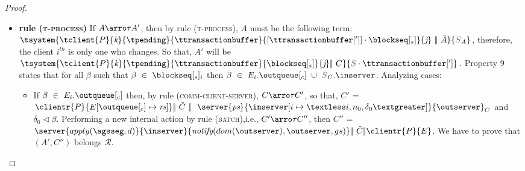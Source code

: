 \begin{proof}
\begin{itemize}
\begin{itemize}
						
\item {\bf rule (\textsc{t-process})} If $A \arroi{\tau} A'$, then by rule (\textsc{\footnotesize{t-process}}), $A$ must be the following term: $\tsystem{\tclient{\tprogram}{\tknown}{\tpending}{\ttransactionbuffer}{[\tsenthead] \cdot \tsent}{\treceivebuffer}\ \bigpar\ \tilde{A}}{\queuemessage_A}$, therefore, the client $i^{th}$ is only one who changes. So that, $A'$ will be $\tsystem{\tclient{\tprogram}{\tknown}{\tpending}{\ttransactionbuffer}{\tsent}{\treceivebuffer}\bigpar\ C}{\queuemessage \cdot \tsenthead}$. Property 9 states that for all $\beta$ such that $\beta \ \in \ \tsent_i$ then $\beta \ \in \ E_{i}.\outclient \ \cup \ \queuemessage_C.\inserver$. Analyzing cases:
					
					
					
					\begin{itemize}
						\item If $\beta \ \in\ E_{i}.\outclient$ then, by rule (\textsc{\footnotesize{comm-client-server}}), $C \arroi{\tau} C'$, so that, $C'$ = $\clientr{P}{\update{E}{\outclient}{\tailround}} \bigpar\ \tilde{C} \ \bigpar\ \ \server{\state}{\update{\inserver}{i}{\headerround}}{\outserver}_C$ and $\delta_0 \triangleleft \beta$. Performing a new internal action by rule (\textsc{\footnotesize{batch}}),i.e., $C' \arroi{\tau} C''$, then $C''$ = $\server{\apply{\persistedstate}{d}}{\inserver}{\notify{dom(\outserver)}{\outserver}{gs}}  \bigpar\ \tilde{C} \bigpar \clientr{P}{\stateclient}$. We have to prove that $(A',C'')$ belongs $\mathcal{R}$.
						

\end{itemize}
\end{itemize}
\end{itemize}
\end{proof}

